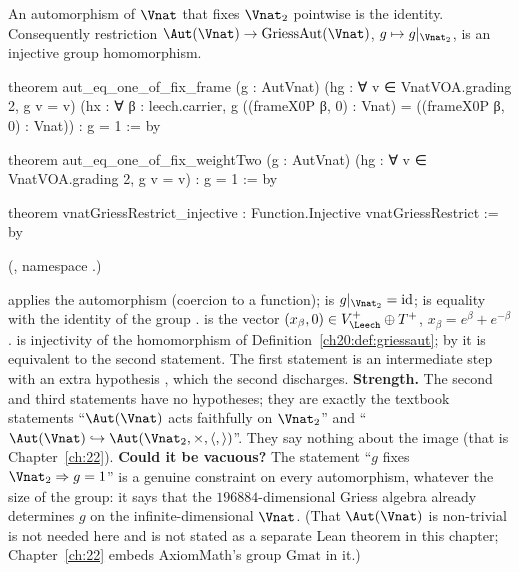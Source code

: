 \begin{theorem}\label{ch20:thm:faithful}
An automorphism of $\Vnat$ that fixes $\Vnat_2$ pointwise is the identity.  Consequently restriction
$\Aut(\Vnat)\to\mathrm{GriessAut}(\Vnat)$, $g\mapsto g|_{\Vnat_2}$, is an injective group homomorphism.
\end{theorem}
\begin{leancode}
theorem aut_eq_one_of_fix_frame (g : AutVnat) (hg : ∀ v ∈ VnatVOA.grading 2, g v = v)
    (hx : ∀ β : leech.carrier, g ((frameX0P β, 0) : Vnat) = ((frameX0P β, 0) : Vnat)) : g = 1 := by

theorem aut_eq_one_of_fix_weightTwo (g : AutVnat) (hg : ∀ v ∈ VnatVOA.grading 2, g v = v) :
    g = 1 := by

theorem vnatGriessRestrict_injective : Function.Injective vnatGriessRestrict := by
\end{leancode}
(, namespace .)
\begin{dictionary}
 applies the automorphism (coercion to a function);  is
$g|_{\Vnat_2}=\mathrm{id}$;  is equality with the identity of the group .
 is the vector $(x_\beta,0)\in\chtwentyVL\oplus\chtwentyTp$, $x_\beta=e^\beta+e^{-\beta}$.
 is injectivity of the homomorphism of
Definition~\ref{ch20:def:griessaut}; by  it is equivalent to the second statement.
The first statement is an intermediate step with an extra hypothesis , which the second discharges.
\textbf{Strength.}  The second and third statements have no hypotheses; they are exactly the textbook statements
``$\Aut(\Vnat)$ acts faithfully on $\Vnat_2$'' and ``$\Aut(\Vnat)\hookrightarrow\Aut(\Vnat_2,\times,\langle,\rangle)$''.
They say nothing about the image (that is Chapter~\ref{ch:22}).  \textbf{Could it be vacuous?}  The statement ``$g$ fixes
$\Vnat_2\Rightarrow g=1$'' is a genuine constraint on every automorphism, whatever the size of the group: it says that the
$196884$-dimensional Griess algebra already determines $g$ on the infinite-dimensional $\Vnat$.  (That $\Aut(\Vnat)$ is
non-trivial is not needed here and is not stated as a separate Lean theorem in this chapter; Chapter~\ref{ch:22} embeds
AxiomMath's group $\mathrm{Gmat}$ in it.)
\end{dictionary}

